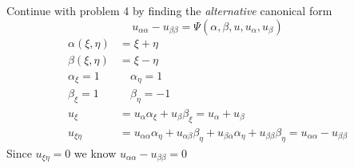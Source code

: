 \documentclass{article}
\begin{document}
Continue with problem 4 by finding the \emph{alternative} canonical form
\[u_{\alpha\alpha}-u_{\beta\beta}=\Psi(\alpha,\beta,u,u_\alpha,u_\beta)\]
\begin{align*}
  \alpha(\xi,\eta)&=\xi+\eta\\
  \beta(\xi,\eta)&=\xi-\eta\\
  \alpha_\xi=1&\quad\alpha_\eta=1\\
  \beta_\xi=1&\quad\beta_\eta=-1\\
  u_{\xi}&=u_\alpha\alpha_\xi+u_\beta\beta_\xi=u_\alpha+u_\beta\\
  u_{\xi\eta}&=u_{\alpha\alpha}\alpha_\eta+u_{\alpha\beta}\beta_\eta+u_{\beta\alpha}\alpha_\eta+u_{\beta\beta}\beta_\eta=u_{\alpha\alpha}-u_{\beta\beta}
\end{align*}
Since $u_{\xi\eta}=0$ we know $u_{\alpha\alpha}-u_{\beta\beta}=0$
\end{document}
